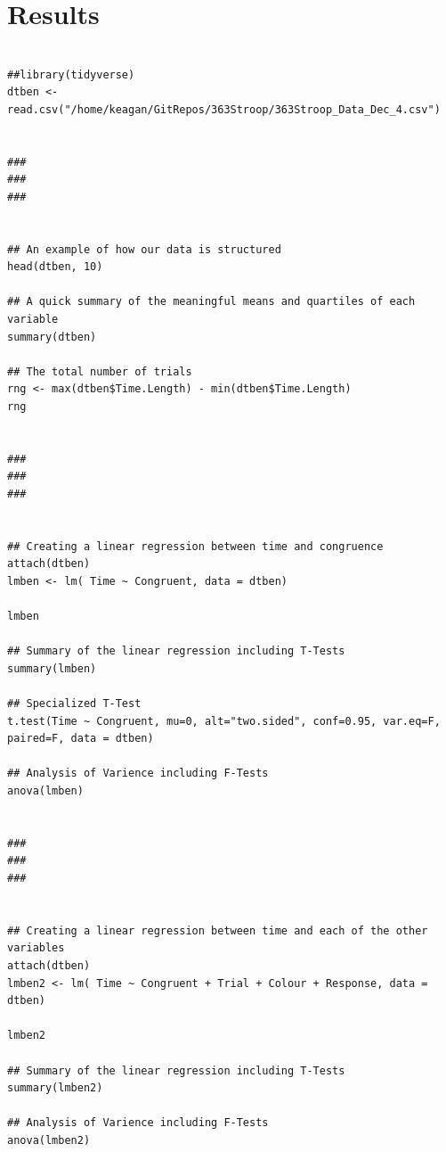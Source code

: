 \documentclass{article}
\begin{document}
\section{Results}
\label{sec:orgc94c371}



\begin{verbatim}

##library(tidyverse)
dtben <- read.csv("/home/keagan/GitRepos/363Stroop/363Stroop_Data_Dec_4.csv")


###
###
###


## An example of how our data is structured
head(dtben, 10)

## A quick summary of the meaningful means and quartiles of each variable
summary(dtben)

## The total number of trials
rng <- max(dtben$Time.Length) - min(dtben$Time.Length)
rng


###
###
###


## Creating a linear regression between time and congruence
attach(dtben)
lmben <- lm( Time ~ Congruent, data = dtben)

lmben

## Summary of the linear regression including T-Tests
summary(lmben)

## Specialized T-Test
t.test(Time ~ Congruent, mu=0, alt="two.sided", conf=0.95, var.eq=F, paired=F, data = dtben)

## Analysis of Varience including F-Tests
anova(lmben)


###
###
###


## Creating a linear regression between time and each of the other variables
attach(dtben)
lmben2 <- lm( Time ~ Congruent + Trial + Colour + Response, data = dtben)

lmben2

## Summary of the linear regression including T-Tests
summary(lmben2)

## Analysis of Varience including F-Tests
anova(lmben2)


\end{verbatim}
\end{document}
